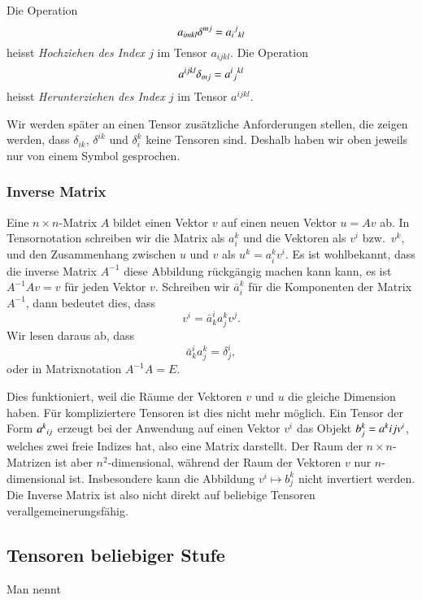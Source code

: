 \begin{definition}
Die Operation
\[
a_{imkl}\delta^{mj}=a_i\mathstrut^j\mathstrut_{kl}
\]
heisst {\em Hochziehen des Index $j$} im Tensor $a_{ijkl}$.
Die Operation
\[
a^{ijkl}\delta_{mj}=a^i\mathstrut_j\mathstrut^{kl}
\]
heisst {\em Herunterziehen des Index $j$} im Tensor $a^{ijkl}$.
\end{definition}

Wir werden später an einen Tensor zusätzliche Anforderungen stellen,
die zeigen werden, dass $\delta_{ik}$, $\delta^{ik}$ und $\delta_i^k$
keine Tensoren sind.
Deshalb haben wir oben jeweils nur von einem Symbol gesprochen.

\subsubsection{Inverse Matrix}
Eine $n\times n$-Matrix $A$ bildet einen Vektor $v$ auf einen
neuen Vektor $u=Av$ ab.
In Tensornotation schreiben wir die Matrix als $a_i^k$ und die Vektoren
als $v^i$ bzw.~$v^k$, und den Zusammenhang zwischen $u$ und $v$ als
$u^k=a_i^kv^i$.
Es ist wohlbekannt, dass die inverse Matrix $A^{-1}$ diese Abbildung
rückgängig machen kann kann, es ist $A^{-1}Av=v$ für jeden Vektor $v$.
Schreiben wir  $\bar a_i^k$ für die Komponenten der Matrix $A^{-1}$,
dann bedeutet dies, dass
\[
v^i = \bar a^i_ka_j^kv^j.
\]
Wir lesen daraus ab, dass
\[
\bar a_k^i a_j^k = \delta^i_j,
\]
oder in Matrixnotation $A^{-1}A=E$.

Dies funktioniert, weil die Räume der Vektoren $v$ und $u$ die gleiche
Dimension haben.
Für kompliziertere Tensoren ist dies nicht mehr möglich.
Ein Tensor der Form $a^k\mathstrut_{ij}$ erzeugt bei der Anwendung
auf einen Vektor $v^i$ das Objekt $b^k_j=a^k\mathstrut{ij}v^i$, welches
zwei freie Indizes hat, also eine Matrix darstellt.
Der Raum der $n\times n$-Matrizen ist aber $n^2$-dimensional, während
der Raum der Vektoren $v$ nur $n$-dimensional ist.
Insbesondere kann die Abbildung $v^i\mapsto b^k_j$ nicht invertiert
werden.
Die Inverse Matrix ist also nicht direkt auf beliebige Tensoren 
verallgemeinerungsfähig.

\subsection{Tensoren beliebiger Stufe}
Man nennt 

